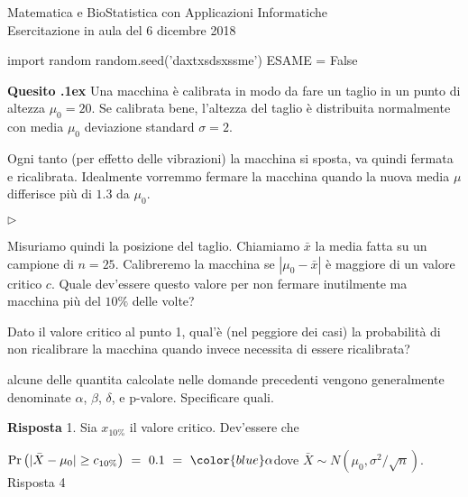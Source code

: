 \documentclass[11pt,twoside,a4paper]{article}
\newcommand{\mylabel}[1]{#1\hfill}
\renewenvironment{itemize}
  {\begin{list}{$\triangleright$}{%
   \setlength{\parskip}{0mm}
   \setlength{\topsep}{.4\baselineskip}
   \setlength{\rightmargin}{0mm}
   \setlength{\listparindent}{0mm}
   \setlength{\itemindent}{0mm}
   \setlength{\labelwidth}{2ex}
   \setlength{\itemsep}{.4\baselineskip}
   \setlength{\parsep}{0mm}
   \setlength{\partopsep}{0mm}
   \setlength{\labelsep}{1ex}
   \setlength{\leftmargin}{\labelwidth+\labelsep}
   \let\makelabel\mylabel}}{%
   \end{list}\vspace*{-1.3mm}}
\newcounter{quesito}
\newenvironment{question}{\addtocounter{quesito}{1}\par\textbf{Quesito \thequesito.\kern1ex}}{\vspace{0.5\parskip}}
\newenvironment{answer}{\par\textbf{Risposta\quad}}{\vspace{\parskip}}
\begin{document}
\colorbox{blue!10}{\begin{minipage}{\textwidth}
Matematica e BioStatistica con Applicazioni Informatiche\\
Esercitazione in aula del 6 dicembre 2018
\end{minipage}}



\begin{pycode}
import random
random.seed('daxtxsdsxssme')
ESAME = False
\end{pycode}


\bigskip\bigskip
\begin{question}
Una macchina è calibrata in modo da fare un taglio in un punto di altezza $\mu_0=20$. Se calibrata bene, l'altezza del taglio è distribuita normalmente con media $\mu_0$ deviazione standard $\sigma=2$. 

Ogni tanto (per effetto delle vibrazioni) la macchina si sposta, va quindi fermata e ricalibrata. Idealmente vorremmo fermare la macchina quando la nuova media $\mu$ differisce più di $1.3$ da $\mu_0$.

\begin{itemize}
\item[1.] Misuriamo quindi la posizione del taglio. Chiamiamo $\bar x$ la media fatta su un campione di $n=25$. Calibreremo la macchina se $|\mu_0-\bar x|$ è maggiore di un valore critico $c$. Quale dev'essere questo valore per non fermare inutilmente ma macchina più del $10\%$ delle volte?

\item[2.] Dato il valore critico al punto 1, qual'è (nel peggiore dei casi) la probabilità di non ricalibrare la macchina quando invece necessita di essere ricalibrata?


\item[4] alcune delle quantita calcolate nelle domande precedenti vengono generalmente denominate $\alpha$, $\beta$, $\delta$, e p-valore. Specificare quali.
\end{itemize}
\begin{answer}
1. Sia $x_{10\%}$ il valore critico. Dev'essere che 

$\Pr\big(|\bar X-\mu_0|\ge c_{10\%}\big)\ =\ 0.1\ =\ {\color{blue}\alpha}$\hfill dove $\bar X\sim N(\mu_0, \sigma^2/\sqrt{n})$.\hfill{\color{blue} Risposta 4} 


\end{answer}
\end{question}
\end{document}
